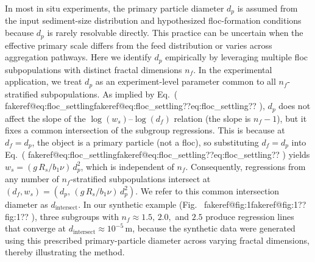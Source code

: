 \documentclass[11pt]{article}
\makeatletter
\newenvironment{Snippet}{%
  \par\vspace{0.3em}\begin{list}{}{\setlength{\leftmargin}{1em}\setlength{\rightmargin}{0.5em}}\item\small\itshape
}{%
  \end{list}\vspace{0.3em}
}
\newcommand{\fakeref}[1]{%
  \ifcsname fakeref@#1\endcsname\csname fakeref@#1\endcsname\else ??#1??\fi
}
\renewcommand{\ref}[1]{\fakeref{#1}}%
\renewcommand{\eqref}[1]{(\fakeref{#1})}%
\makeatother
\begin{document}
\begin{enumerate}[label=\textbf{R3.\arabic*.}]
\begin{Snippet}
In most in situ experiments, the primary particle diameter \(d_p\) is assumed from the input sediment-size distribution and hypothesized floc-formation conditions because \(d_p\) is rarely resolvable directly. This practice can be uncertain when the effective primary scale differs from the feed distribution or varies across aggregation pathways. Here we identify \(d_p\) empirically by leveraging multiple floc subpopulations with distinct fractal dimensions \(n_f\). In the experimental application, we treat $d_p$ as an experiment-level parameter common to all $n_f$-stratified subpopulations. As implied by Eq.~\eqref{eq:floc_settling}, \(d_p\) does not affect the slope of the \(\log(w_s)\)--\(\log(d_f)\) relation (the slope is \(n_f-1\)), but it fixes a common intersection of the subgroup regressions. This is because at \(d_f=d_p\), the object is a primary particle (not a floc), so substituting \(d_f=d_p\) into Eq.~\eqref{eq:floc_settling} yields \(w_s=(g\,R_s/b_1\nu)\,d_p^{2}\), which is independent of \(n_f\). Consequently, regressions from any number of \(n_f\)-stratified subpopulations intersect at \((d_f, w_s)=(d_p,\,(g\,R_s/b_1\nu)\,d_p^{2})\). We refer to this common intersection diameter as $d_\text{intersect}$. In our synthetic example (Fig.~\ref{fig:1}), three subgroups with \(n_f \approx 1.5,\,2.0,\) and \(2.5\) produce regression lines that converge at \(d_\text{intersect} \approx 10^{-5}\,\mathrm{m}\), because the synthetic data were generated using this prescribed primary-particle diameter across varying fractal dimensions, thereby illustrating the method.



\end{Snippet}
\end{enumerate}
\end{document}
